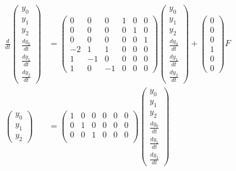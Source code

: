\documentclass[a4paper,11pt,fleqn]{jreport}
\begin{document}
\begin{align}
 \frac{d}{dt} \left(\begin{array}{c}
	         y_0 \\
		     y_1 \\
		     y_2 \\
		     \frac{dy_0}{dt} \\
		     \frac{dy_1}{dt} \\
		     \frac{dy_2}{dt}
		    \end{array}\right)
 &=
 \left(\begin{array}{rrrrrr}
        0 & 0 & 0 & 1 & 0 & 0      \\
        0 & 0 & 0 & 0 & 1 & 0      \\
        0 & 0 & 0 & 0 & 0 & 1      \\
	-2& 1 & 1 & 0 & 0 & 0 \\
	1 & -1& 0 & 0 & 0 & 0 \\
	1 & 0 & -1& 0 & 0 & 0 
       \end{array}\right)
 \left(\begin{array}{c}
	         y_0 \\
		     y_1 \\
		     y_2 \\
		     \frac{dy_0}{dt} \\
		     \frac{dy_1}{dt} \\
		     \frac{dy_2}{dt}
       \end{array}\right)
 +
 \left(\begin{array}{c}
        0 \\
        0 \\
        0 \\
	    1 \\
	    0 \\
	    0 
       \end{array}\right)
        F
\nonumber
\\
 \left(\begin{array}{c}
	    y_0 \\
		y_1 \\
		y_2
       \end{array}\right)
 &=
 \left(\begin{array}{rrrrrr}
         1 & 0 & 0 & 0 & 0 & 0  \\
         0 & 1 & 0 & 0 & 0 & 0 \\
         0 & 0 & 1 & 0 & 0 & 0 \\
       \end{array}\right)
 \left(\begin{array}{c}
	         y_0 \\
		     y_1 \\
		     y_2 \\
		     \frac{dy_0}{dt} \\
		     \frac{dy_1}{dt} \\
		     \frac{dy_2}{dt}
       \end{array}\right)
\nonumber
\end{align}
\end{document}
